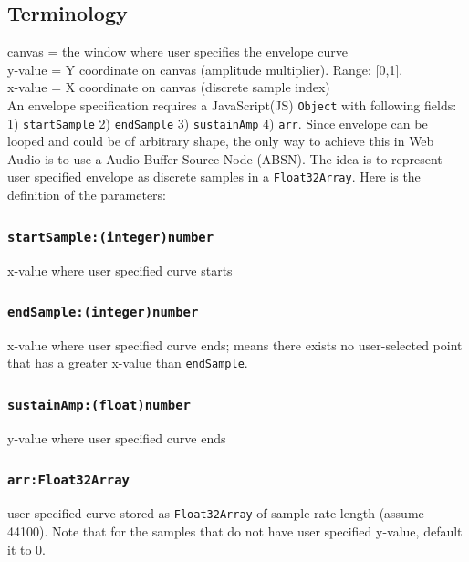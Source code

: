 \documentclass[20pt]{article}
\begin{document}
\subsection*{Terminology}
canvas = the window where user specifies the envelope curve\\
y-value = Y coordinate on canvas  (amplitude multiplier). Range: [0,1].\\
x-value = X coordinate on canvas (discrete sample index)\\

An envelope specification requires a JavaScript(JS) \texttt{Object} with following fields: 1) \texttt{startSample} 2) \texttt{endSample} 3) \texttt{sustainAmp} 4) \texttt{arr}. Since envelope can be looped and could be of arbitrary shape, the only way to achieve this in Web Audio is to use a Audio Buffer Source Node (ABSN). The idea is to represent user specified envelope as discrete samples in a \texttt{Float32Array}. Here is the definition of the parameters:

\subsubsection*{\texttt{startSample:(integer)\footnotemark[1] number}}
x-value where user specified curve starts\\
\subsubsection*{\texttt{endSample:(integer)\footnotemark[1] number}}
x-value where user specified curve ends; means there exists no user-selected point that has a greater x-value than \texttt{endSample}.\\
\subsubsection*{\texttt{sustainAmp:(float)\footnotemark[1] number}}
y-value where user specified curve ends\\
\subsubsection*{\texttt{arr:Float32Array} }
user specified curve stored as \texttt{Float32Array} of sample rate length (assume 44100). Note that for the samples that do not have user specified y-value, default it to 0.


\newpage
\end{document}
